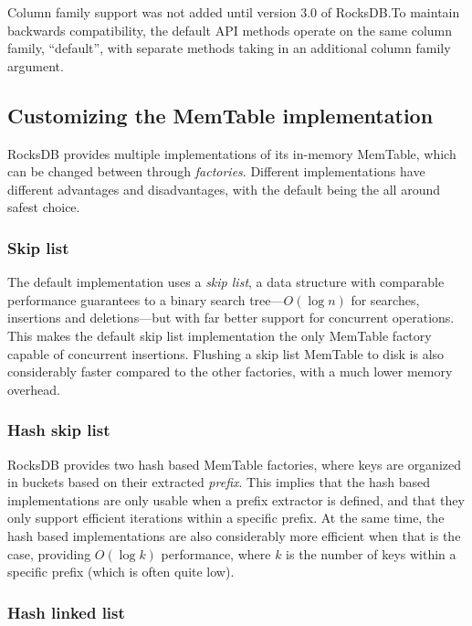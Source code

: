 Column family support was not added until version 3.0 of RocksDB.\@ To maintain
backwards compatibility, the default API methods operate on the same column
family, ``default'', with separate methods taking in an additional column family
argument.

\subsection{Customizing the MemTable implementation}\label{sec:memtable-impl}

RocksDB provides multiple implementations of its in-memory
MemTable, which can be
changed between through \textit{factories}. Different implementations have
different advantages and disadvantages, with the default being the all around
safest choice.

\subsubsection{Skip list}

The default implementation uses a \textit{skip list}, a data structure with
comparable performance guarantees to a binary search tree---$ O(\log n) $ for
searches, insertions and deletions---but with far better support for concurrent
operations. This makes the default skip list implementation the only MemTable
factory capable of concurrent insertions. Flushing a skip list MemTable to disk
is also considerably faster compared to the other factories, with a much lower
memory overhead.

\subsubsection{Hash skip list}

RocksDB provides two hash based MemTable factories, where keys are organized in
buckets based on their extracted \textit{prefix}. This implies that the hash
based implementations are only usable when a prefix extractor is defined, and
that they only support efficient iterations within a specific prefix. At the
same time, the hash based implementations are also considerably more efficient
when that is the case, providing $ O(\log k) $ performance, where $ k $ is the
number of keys within a specific prefix (which is often quite low).

\subsubsection{Hash linked list}

